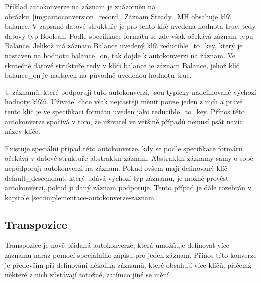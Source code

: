 \documentclass[FM,bw,DP]{tulthesis}
\begin{document}
Příklad autokonverze na záznam je znázorněn na obrázku~\ref{img:autoconversion_record}. Záznam Steady\_MH obsahuje klíč balance. V zapsané datové struktuře je pro tento klíč uvedena hodnota true, tedy datový typ Boolean. Podle specifikace formátu se zde však očekává záznam typu Balance. Jelikož má záznam Balance uvedený klíč reducible\_to\_key, který je nastaven na hodnotu balance\_on, tak dojde k autokonverzi na záznam. Ve skutečné datové struktuře tedy v klíči balance je záznam Balance, jehož klíč balance\_on je nastaven na původně uvedenou hodnotu true.

U záznamů, které podporují tuto autokonverzi, jsou typicky nadefinované výchozí hodnoty klíčů. Uživatel chce však nejčastěji měnit pouze jeden z nich a právě tento klíč je ve specifikaci formátu uveden jako reducible\_to\_key. Přínos této autokonverze spočívá v tom, že uživatel ve většině případů nemusí psát navíc název klíče.

Existuje speciální případ této autokonverze, kdy se podle specifikace formátu očekává v datové struktuře abstraktní záznam. Abstraktní záznamy samy o sobě nepodporují autokonverzi na záznam. Pokud ovšem mají definovaný klíč default\_de\-scend\-ant, který udává výchozí typ záznamu, je možné provést autokonverzi, pokud ji daný záznam podporuje. Tento případ je dále rozebrán v kapitole \ref{sec:implementace-autokonverze-zaznam}.

\subsection{Transpozice}
Transpozice je nově přidaná autokonverze, která umožňuje definovat více záznamů naráz pomocí speciálního zápisu pro jeden záznam. Přínos této konverze je především při definování několika záznamů, které obsahují více klíčů, přičemž některé z nich zůstávají totožné, zatímco jiné se mění.
\end{document}

